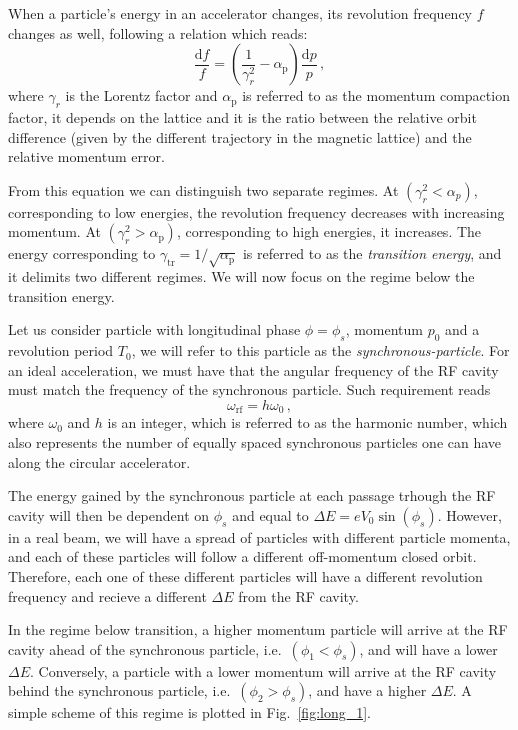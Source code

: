 When a particle's energy in an accelerator changes, its revolution frequency $f$ changes as well, following a relation which reads:
\begin{equation}
    \frac{\mathrm{d} f}{f}=\left(\frac{1}{\gamma_r^2}-\alpha_{\mathrm{p}}\right) \frac{\mathrm{d} p}{p}\,,
\end{equation}
where $\gamma_r$ is the Lorentz factor and $\alpha_{\mathrm{p}}$ is referred to as the momentum compaction factor, it depends on the lattice and it is the   ratio   between the  relative   orbit   difference (given by the different trajectory in the magnetic lattice)  and the relative   momentum   error.

From this equation we can distinguish two separate regimes. At $\left(\gamma_r^2<\alpha_p\right)$, corresponding to low energies, the revolution frequency decreases with increasing momentum. At $\left(\gamma_r^2>\alpha_{\mathrm{p}}\right)$, corresponding to high energies, it increases. The energy corresponding to $\gamma_{\mathrm{tr}}=1 / \sqrt{\alpha_{\mathrm{p}}}$ is referred to as the \textit{transition energy}, and it delimits two different regimes. We will now focus on the regime below the transition energy.

Let us consider particle with longitudinal phase $\phi=\phi_s$, momentum $p_0$ and a revolution period $T_0$, we will refer to this particle as the \textit{synchronous-particle}. For an ideal acceleration, we must have that the angular frequency of the RF cavity must match the frequency of the synchronous particle. Such requirement reads
\begin{equation}
    \omega_{\mathrm{rf}}=h \omega_0\,,
\end{equation}
where $\omega_0$ and $h$ is an integer, which is referred to as the harmonic number, which also represents the number of equally spaced synchronous particles one can have along the circular accelerator.

The energy gained by the synchronous particle at each passage trhough the RF cavity will then be dependent on $\phi_s$ and equal to $\Delta E=e V_0 \sin \left(\phi_s\right)$. However, in a real beam, we will have a spread of particles with different particle momenta, and each of these particles will follow a different off-momentum closed orbit. Therefore, each one of these different particles will have a different revolution frequency and recieve a different $\Delta E$ from the RF cavity.

In the regime below transition, a higher momentum particle will arrive at the RF cavity ahead of the synchronous particle, i.e.\ $\left(\phi_1<\phi_s\right)$, and will have a lower $\Delta E$. Conversely, a particle with a lower momentum will arrive at the RF cavity behind the synchronous particle, i.e.\ $\left(\phi_2>\phi_s\right)$, and have a higher $\Delta E$. A simple scheme of this regime is plotted in Fig.~\ref{fig:long_1}.

